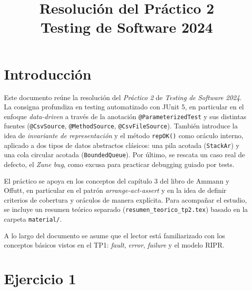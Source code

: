 \documentclass[12pt,a4paper]{article}
\title{\textbf{Resolución del Práctico 2}\\Testing de Software 2024}
\author{}
\date{}
\begin{document}
\maketitle
\tableofcontents
\newpage

\section*{Introducción}
Este documento reúne la resolución del \textit{Práctico 2} de \textit{Testing de Software 2024}. La consigna profundiza en testing automatizado con JUnit 5, en particular en el enfoque \textit{data-driven} a través de la anotación \texttt{@ParameterizedTest} y sus distintas fuentes (\texttt{@CsvSource}, \texttt{@MethodSource}, \texttt{@CsvFileSource}). También introduce la idea de \textit{invariante de representación} y el método \texttt{repOK()} como oráculo interno, aplicado a dos tipos de datos abstractos clásicos: una pila acotada (\texttt{StackAr}) y una cola circular acotada (\texttt{BoundedQueue}). Por último, se rescata un caso real de defecto, el \textit{Zune bug}, como excusa para practicar debugging guiado por tests.

El práctico se apoya en los conceptos del capítulo 3 del libro de Ammann y Offutt, en particular en el patrón \textit{arrange-act-assert} y en la idea de definir criterios de cobertura y oráculos de manera explícita. Para acompañar el estudio, se incluye un resumen teórico separado (\texttt{resumen\_teorico\_tp2.tex}) basado en la carpeta \texttt{material/}.

A lo largo del documento se asume que el lector está familiarizado con los conceptos básicos vistos en el TP1: \textit{fault}, \textit{error}, \textit{failure} y el modelo RIPR.

\section{Ejercicio 1}
\end{document}
